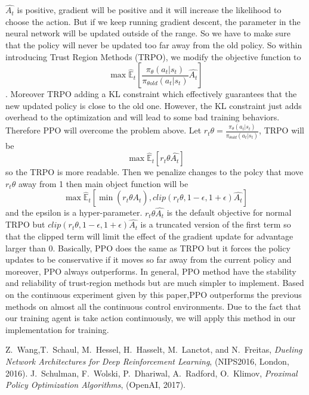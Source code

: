 \documentclass[%
,aps%
 ,twocolumn%
 ,secnumarabic%
,amssymb, amsmath,nobibnotes, aps, prl, floatfix]{revtex4-1}
\begin{document}
$\hat{A_t}$ is positive, gradient will be positive and it will increase the likelihood to choose the action. But if we keep running gradient descent, the parameter in the neural network will be updated outside of the range. So we have to make sure that the policy will never be updated too far away from the old policy. So within introducing Trust Region Methods (TRPO)\cite{SWPRK}, we modify the objective function to $$ \max\hat{\mathbb{E}}_{t}[\frac{\pi_{\theta}(a_{t}|s_{t})}{\pi_{\theta old}(a_{t}|s_{t})}\hat{A_t}] $$. Moreover TRPO adding a KL constraint  which effectively guarantees that the new updated policy is close to the old one. However, the KL constraint just adds overhead to the optimization and will lead to some bad training behaviors. Therefore PPO will overcome the problem above.  Let  $r_{t}\theta = \frac{\pi_{\theta}(a_{t}|s_{t})}{\pi_{\theta old}(a_{t}|s_{t})}$, TRPO will be $$ \max\hat{\mathbb{E}}_{t}[r_{t}\theta \hat{A_t}] $$ so the TRPO is more readable. Then we penalize changes to the polcy that move $r_{t}\theta$ away from 1 then main object function will be $$ \max \hat{\mathbb{E}}_{t} [\min(r_{t}\theta \hat{A_t}), clip(r_{t}\theta,1-\epsilon,1+\epsilon)\hat{A_t}]$$ and the epsilon is a hyper-parameter. $r_{t}\theta \hat{A_t}$ is the default objective for normal TRPO but $clip(r_{t}\theta,1-\epsilon,1+\epsilon)\hat{A_t}$ is a truncated version of the first term so that the clipped term will limit the effect of the gradient update for advantage larger than 0\cite{SWPRK}. Basically, PPO does the same as TRPO but it forces the policy updates to be conservative if it moves so far away from the current policy and moreover, PPO always outperforms. In general, PPO method have the stability and reliability of trust-region methods but are much simpler to implement\cite{SWPRK}. Based on the continuous experiment given by this paper,PPO outperforms the previous methods on almost all the continuous control environments. Due to the fact that our training agent is take action continuously, we will apply this method in our implementation for training.


\begin{thebibliography}{}\label{sec:TeXbooks}
 Z.~Wang,T.~Schaul, M.~Hessel, H.~Hasselt, M.~Lanctot, and N.~Freitas, \textit{Dueling Network Architectures for Deep Reinforcement Learning}, (NIPS2016, London, 2016).
 J.~Schulman, F.~Wolski, P.~Dhariwal, A.~Radford, O.~Klimov, \textit{Proximal Policy Optimization Algorithms}, (OpenAI, 2017).
\end{thebibliography}
\end{document}
